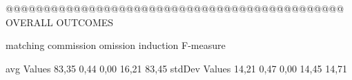@@@@@@@@@@@@@@@@@@@@@@@@@@@@@@@@@@@@@@@@@@@@@ OVERALL OUTCOMES

               matching commission   omission  induction  F-measure
               
avg Values      83,35       0,44       0,00      16,21     83,45        
stdDev Values    14,21       0,47       0,00      14,45      14,71        